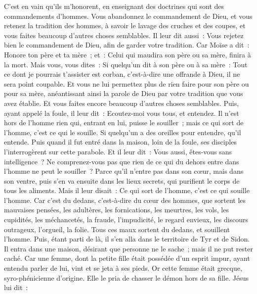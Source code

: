 \begin{multicols}{2}
C'est en vain qu'ils m'honorent, en enseignant des doctrines qui sont des commandements d'hommes.
Vous abandonnez le commandement de Dieu, et vous retenez la tradition des hommes, à savoir le lavage des cruches et des coupes, et vous faites beaucoup d'autres choses semblables.
Il leur dit aussi~: Vous rejetez bien le commandement de Dieu, afin de garder votre tradition.
Car Moïse a dit~: Honore ton père et ta mère~; et~: Celui qui maudira son père ou sa mère, finira à la mort.
Mais vous, vous dites~: Si quelqu'un dit à son père ou à sa mère~: Tout ce dont je pourrais t'assister est corban, c'est-à-dire une offrande à Dieu, il ne sera point coupable.
Et vous ne lui permettez plus de rien faire pour son père ou pour sa mère,
anéantissant ainsi la parole de Dieu par votre tradition que vous avez établie. Et vous faites encore beaucoup d'autres choses semblables.
Puis, ayant appelé la foule, il leur dit~: Ecoutez-moi vous tous, et entendez.
Il n'est hors de l'homme rien qui, entrant en lui, puisse le souiller~; mais ce qui sort de l'homme, c'est ce qui le souille.
Si quelqu'un a des oreilles pour entendre, qu'il entende.
Puis quand il fut entré dans la maison, loin de la foule, ses disciples l'interrogèrent sur cette parabole.
Et il leur dit~: Vous aussi, êtes-vous sans intelligence~? Ne comprenez-vous pas que rien de ce qui du dehors entre dans l'homme ne peut le souiller~?
Parce qu'il n'entre pas dans son cœur, mais dans son ventre, puis s'en va ensuite dans les lieux secrets, qui purifient le corps de tous les aliments.
Mais il leur disait~: Ce qui sort de l'homme, c'est ce qui souille l'homme.
Car c'est du dedans, c'est-à-dire du cœur des hommes, que sortent les mauvaises pensées, les adultères, les fornications, les meurtres,
les vols, les cupidités, les méchancetés, la fraude, l'impudicité, le regard envieux, les discours outrageux, l'orgueil, la folie.
Tous ces maux sortent du dedans, et souillent l'homme.
Puis, étant parti de là, il s'en alla dans le territoire de Tyr et de Sidon. Il entra dans une maison, désirant que personne ne le sache~; mais il ne put rester caché.
Car une femme, dont la petite fille était possédée d'un esprit impur, ayant entendu parler de lui, vint et se jeta à ses pieds.
Or cette femme était grecque, syro-phénicienne d'origine. Elle le pria de chasser le démon hors de sa fille. Jésus lui dit~:

\end{multicols}
